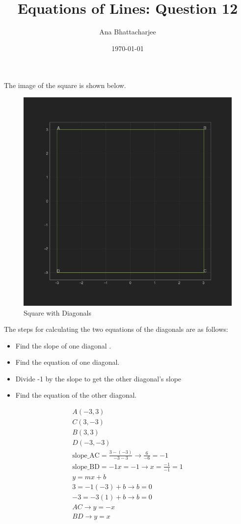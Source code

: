 \documentclass{article}
\begin{document}
\title{Equations of Lines: Question 12}
\author{Ana Bhattacharjee}
\date{\today}
\maketitle{}

\begin{center}
The image of the square is shown below.
\begin{figure}
  \includegraphics[width=1.1\columnwidth]{../line_eq_q12}
  \caption{Square with Diagonals}
\end{figure}
The steps for calculating the two equations of the diagonals are as follows:
\begin{itemize}
  \item Find the slope of one diagonal .
  \item Find the equation of one diagonal.
  \item Divide -1 by the slope to get the other diagonal's slope
  \item Find the equation of the other diagonal.
\end{itemize}
\par
\begin{align}
  A (-3, 3) \\
  C (3, -3) \\
  B (3,3) \\
  D (-3, -3) \\
  \text{slope\_{AC}} = \frac{3 - (-3)}{-3 - 3} \rightarrow \frac{6}{-6} = -1 \\
  \text{slope\_{BD}} = -1 x = -1 \rightarrow x = \frac{-1}{-1} = 1 \\
  y = mx + b \\
  3 = -1(-3) + b \rightarrow b = 0 \\
  -3 = -3(1) + b \rightarrow b = 0 \\
  AC \rightarrow y = -x \\
  BD \rightarrow y = x
\end{align}
\end{center}
\end{document}
